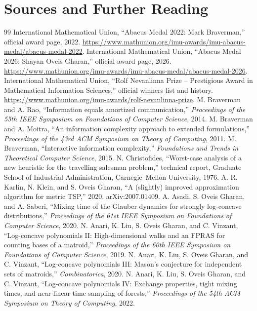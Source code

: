 \documentclass[11pt,oneside]{book}
\begin{document}
\chapter*{Sources and Further Reading}
\begin{thebibliography}{99}
 International Mathematical Union, ``Abacus Medal 2022: Mark Braverman,'' official award page, 2022. \url{https://www.mathunion.org/imu-awards/imu-abacus-medal/abacus-medal-2022}.
 International Mathematical Union, ``Abacus Medal 2026: Shayan Oveis Gharan,'' official award page, 2026. \url{https://www.mathunion.org/imu-awards/imu-abacus-medal/abacus-medal-2026}.
 International Mathematical Union, ``Rolf Nevanlinna Prize -- Prestigious Award in Mathematical Information Sciences,'' official winners list and history. \url{https://www.mathunion.org/imu-awards/rolf-nevanlinna-prize}.
 M. Braverman and A. Rao, ``Information equals amortized communication,'' \emph{Proceedings of the 55th IEEE Symposium on Foundations of Computer Science}, 2014.
 M. Braverman and A. Moitra, ``An information complexity approach to extended formulations,'' \emph{Proceedings of the 43rd ACM Symposium on Theory of Computing}, 2011.
 M. Braverman, ``Interactive information complexity,'' \emph{Foundations and Trends in Theoretical Computer Science}, 2015.
 N. Christofides, ``Worst-case analysis of a new heuristic for the travelling salesman problem,'' technical report, Graduate School of Industrial Administration, Carnegie--Mellon University, 1976.
 A. R. Karlin, N. Klein, and S. Oveis Gharan, ``A (slightly) improved approximation algorithm for metric TSP,'' 2020. arXiv:2007.01409.
 A. Asadi, S. Oveis Gharan, and A. Saberi, ``Mixing time of the Glauber dynamics for strongly log-concave distributions,'' \emph{Proceedings of the 61st IEEE Symposium on Foundations of Computer Science}, 2020.
 N. Anari, K. Liu, S. Oveis Gharan, and C. Vinzant, ``Log-concave polynomials II: High-dimensional walks and an FPRAS for counting bases of a matroid,'' \emph{Proceedings of the 60th IEEE Symposium on Foundations of Computer Science}, 2019.
 N. Anari, K. Liu, S. Oveis Gharan, and C. Vinzant, ``Log-concave polynomials III: Mason's conjecture for independent sets of matroids,'' \emph{Combinatorica}, 2020.
 N. Anari, K. Liu, S. Oveis Gharan, and C. Vinzant, ``Log-concave polynomials IV: Exchange properties, tight mixing times, and near-linear time sampling of forests,'' \emph{Proceedings of the 54th ACM Symposium on Theory of Computing}, 2022.

\end{thebibliography}
\end{document}
